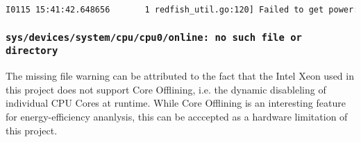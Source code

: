 \begin{lstlisting}[language=bash]
I0115 15:41:42.648656       1 redfish_util.go:120] Failed to get power: json: cannot unmarshal number 3.07 into Go struct field Voltages.Voltages.ReadingVolts of type int
\end{lstlisting}

\subsubsection{\texttt{sys/devices/system/cpu/cpu0/online: no such file or directory}}

The missing file warning can be attributed to the fact that the Intel Xeon used in this project does not support Core Offlining, i.e. the dynamic disableling of individual CPU Cores at runtime. While Core Offlining is an interesting feature for energy-efficiency ananlysis, this can be acccepted as a hardware limitation of this project.